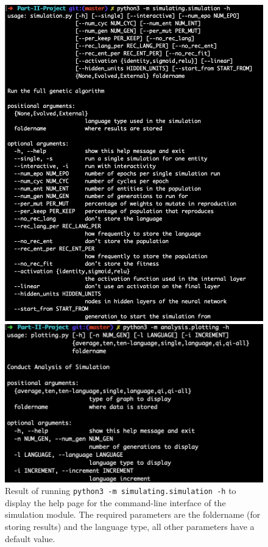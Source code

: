 \documentclass[12pt,a4paper]{report}
\begin{document}
\begin{figure}[t]
   \centering
   \begin{minipage}{0.49\textwidth}
          \centering
          \captionsetup{width=.9\linewidth}
          \includegraphics[width=1.\linewidth]{figs/commandline}
          \caption{Result of running \texttt{python3 -m simulating.simulation -h} to display the help page for the command-line interface of the simulation module. The required parameters are the foldername (for storing results) and the language type, all other parameters have a default value.}
      \label{fig:commandline}
   \end{minipage}
   \begin{minipage}{0.49\textwidth}
          \centering
          \captionsetup{width=.9\linewidth}
          \includegraphics[width=1.\linewidth]{figs/commandline2}

\end{minipage}
\end{figure}
\end{document}
